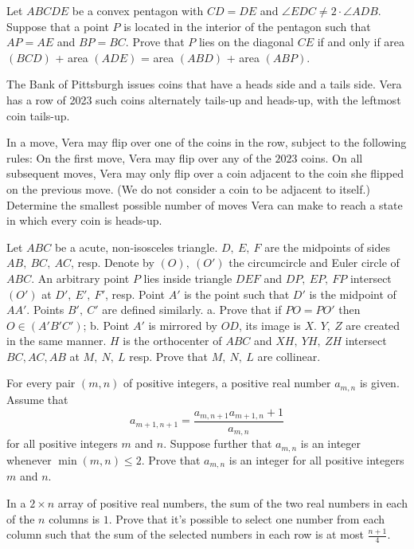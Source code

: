 \documentclass[11pt]{scrartcl}
\begin{document}
\begin{problem}[1336030836839904136]
Let $ABCDE$ be a convex pentagon with $CD= DE$ and $\angle EDC \ne 2 \cdot \angle ADB$.
Suppose that a point $P$ is located in the interior of the pentagon such that $AP =AE$ and $BP= BC$.
Prove that $P$ lies on the diagonal $CE$ if and only if area $(BCD)$ + area $(ADE)$ = area $(ABD)$ + area $(ABP)$.
\end{problem}
\begin{problem}[899785005954032]
The Bank of Pittsburgh issues coins that have a heads side and a tails side. Vera has a row of 2023 such coins alternately tails-up and heads-up, with the leftmost coin tails-up.

In a move, Vera may flip over one of the coins in the row, subject to the following rules:
On the first move, Vera may flip over any of the $2023$ coins.
On all subsequent moves, Vera may only flip over a coin adjacent to the coin she flipped on the previous move. (We do not consider a coin to be adjacent to itself.)
Determine the smallest possible number of moves Vera can make to reach a state in which every coin is heads-up.
\end{problem}
\begin{problem}[7220404010846068686]
	Let $ABC$ be a acute, non-isosceles triangle. $D,\ E,\ F$ are the midpoints of sides $AB,\ BC,\ AC$, resp. Denote by $(O),\ (O')$ the circumcircle and Euler circle of $ABC$. An arbitrary point $P$ lies inside triangle $DEF$ and $DP,\ EP,\ FP$ intersect $(O')$ at $D',\ E',\ F'$, resp. Point $A'$ is the point such that $D'$ is the midpoint of $AA'$. Points $B',\ C'$ are defined similarly.
a. Prove that if $PO=PO'$ then $O\in(A'B'C')$;
b. Point $A'$ is mirrored by $OD$, its image is $X$. $Y,\ Z$ are created in the same manner. $H$ is the orthocenter of $ABC$ and $XH,\ YH,\ ZH$ intersect $BC, AC, AB$ at $M,\ N,\ L$ resp. Prove that $M,\ N,\ L$ are collinear.
\end{problem}
\begin{problem}[5180896359975323937]
For every pair $(m, n)$ of positive integers, a positive real number $a_{m, n}$ is given. Assume that
\[a_{m+1, n+1} = \frac{a_{m, n+1} a_{m+1, n} + 1}{a_{m, n}}\]for all positive integers $m$ and $n$. Suppose further that $a_{m, n}$ is an integer whenever $\min(m, n) \le 2$. Prove that $a_{m, n}$ is an integer for all positive integers $m$ and $n$.
\end{problem}
\begin{problem}[245448917471703]
  In a $2 \times n$ array of positive real numbers,
  the sum of the two real numbers in each of the $n$ columns is $1$.
  Prove that it's possible to select one number from each column
  such that the sum of the selected numbers in each row is
  at most $\frac{n+1}{4}$.
\end{problem}
\end{document}
